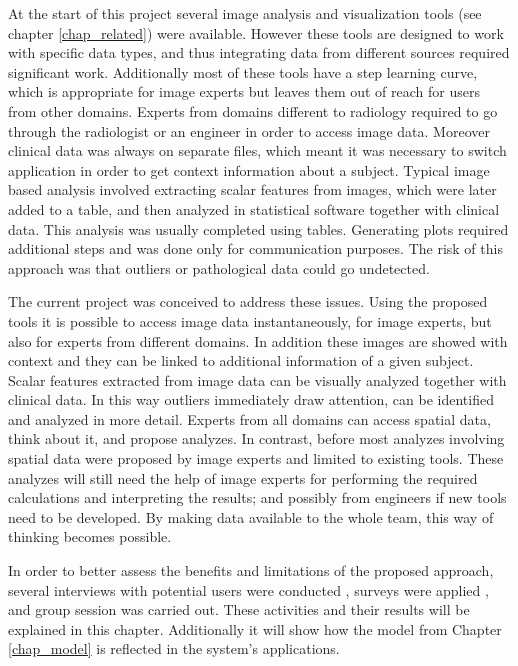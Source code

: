 

At the start of this project several image analysis and visualization tools (see chapter \ref{chap_related}) were available. However these tools are designed to work with specific data types, and thus integrating data from different sources required significant work. Additionally most of these tools have a step learning curve, which is appropriate for image experts but leaves them out of reach for users from other domains. Experts from domains different to radiology required to go through the radiologist or an engineer in order to access image data. Moreover clinical data was always on separate files, which meant it was necessary to switch application in order to get context information about a subject. Typical image based analysis involved extracting scalar features from images, which were later added to a table, and then analyzed in statistical software together with clinical data. This analysis was usually completed using tables. Generating plots required additional steps and was done only for communication purposes. The risk of this approach was that outliers or pathological data could go undetected. 

The current project was conceived to address these issues. Using the proposed tools it is possible to access image data instantaneously,  for image experts, but also for experts from different domains. In addition these images are showed with context and they can be linked to additional information of a given subject. Scalar features extracted from image data can be visually analyzed together with clinical data. In this way outliers immediately draw attention, can be identified and analyzed in more detail. Experts from all domains can access spatial data, think about it, and propose analyzes. In contrast, before most analyzes involving spatial data were proposed by image experts and limited to existing tools. These analyzes will still need the help of image experts for performing the required calculations and interpreting the results; and possibly from engineers if new tools need to be developed. By making data available to the whole team, this way of thinking becomes possible.    

In order to better assess the benefits and limitations of the proposed approach, several interviews with potential users were conducted , surveys were applied , and group session was carried out. These activities and their results will be explained in this chapter. Additionally it will show how the model from Chapter \ref{chap_model} is reflected in the system's applications.	

